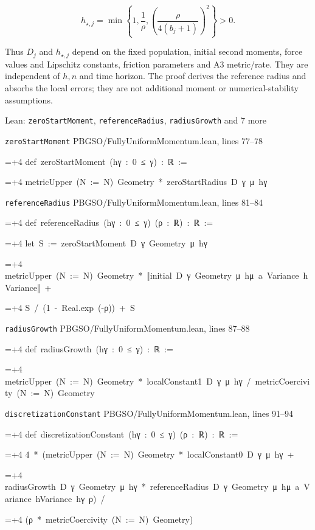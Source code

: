 \documentclass[11pt,a4paper]{report}
\newlength{\leancharwidth}
\newenvironment{leancode}{\par\smallskip\begingroup\ttfamily\footnotesize\raggedright
  \settowidth{\leancharwidth}{M}\setlength{\parskip}{0pt}\setlength{\parindent}{0pt}
  \frenchspacing}{\par\endgroup\smallskip}
\newcommand{\leanline}[2]{\hangindent=\dimexpr#1\leancharwidth+4\leancharwidth\relax
  \hangafter=1\noindent\hspace*{#1\leancharwidth}#2\par}
\newcommand{\leansource}[1]{\par{\footnotesize\color{leanmuted}#1}\par}
\begin{document}
\[h_{\star,j}=\min\left\{1,\frac1\rho,\left(\frac{\rho}{4(b_j+1)}\right)^2\right\}>0.\]





Thus \(D_j\) and \(h_{\star,j}\) depend on the fixed population, initial second moments, force values and Lipschitz constants, friction parameters and A3 metric/\allowbreak{}rate. They are independent of \(h,n\) and time horizon. The proof derives the reference radius and absorbs the local errors; they are not additional moment or numerical-stability assumptions.

\begin{leanbox}{Lean: \texttt{zeroStartMoment}, \texttt{referenceRadius}, \texttt{radiusGrowth} and 7 more}
\leansource{\texttt{zeroStartMoment} \quad PBGSO/\allowbreak{}FullyUniformMomentum.lean, lines 77–78}
\begin{leancode}
\leanline{0}{def\ zeroStartMoment\ (hγ\ :\ 0\ ≤\ γ)\ :\ ℝ\ :=}
\leanline{2}{metricUpper\ (N\ :=\ N)\ Geometry\ *\ zeroStartRadius\ D\ γ\ μ\ hγ}
\end{leancode}
\leansource{\texttt{referenceRadius} \quad PBGSO/\allowbreak{}FullyUniformMomentum.lean, lines 81–84}
\begin{leancode}
\leanline{0}{def\ referenceRadius\ (hγ\ :\ 0\ ≤\ γ)\ (ρ\ :\ ℝ)\ :\ ℝ\ :=}
\leanline{2}{let\ S\ :=\ zeroStartMoment\ D\ γ\ Geometry\ μ\ hγ}
\leanline{2}{metricUpper\ (N\ :=\ N)\ Geometry\ *\ ‖initial\ D\ γ\ Geometry\ μ\ hμ\ a\ Variance\ hVariance‖\ +}
\leanline{4}{S\ /\ (1\ -\ Real.exp\ (-ρ))\ +\ S}
\end{leancode}
\leansource{\texttt{radiusGrowth} \quad PBGSO/\allowbreak{}FullyUniformMomentum.lean, lines 87–88}
\begin{leancode}
\leanline{0}{def\ radiusGrowth\ (hγ\ :\ 0\ ≤\ γ)\ :\ ℝ\ :=}
\leanline{2}{metricUpper\ (N\ :=\ N)\ Geometry\ *\ localConstant1\ D\ γ\ μ\ hγ\ /\ metricCoercivity\ (N\ :=\ N)\ Geometry}
\end{leancode}
\leansource{\texttt{discretizationConstant} \quad PBGSO/\allowbreak{}FullyUniformMomentum.lean, lines 91–94}
\begin{leancode}
\leanline{0}{def\ discretizationConstant\ (hγ\ :\ 0\ ≤\ γ)\ (ρ\ :\ ℝ)\ :\ ℝ\ :=}
\leanline{2}{4\ *\ (metricUpper\ (N\ :=\ N)\ Geometry\ *\ localConstant0\ D\ γ\ μ\ hγ\ +}
\leanline{4}{radiusGrowth\ D\ γ\ Geometry\ μ\ hγ\ *\ referenceRadius\ D\ γ\ Geometry\ μ\ hμ\ a\ Variance\ hVariance\ hγ\ ρ)\ /}
\leanline{6}{(ρ\ *\ metricCoercivity\ (N\ :=\ N)\ Geometry)}
\end{leancode}

\end{leanbox}
\end{document}

